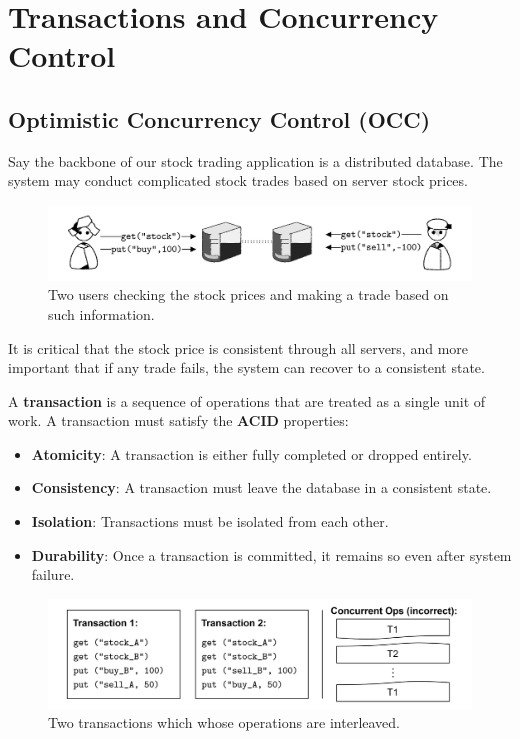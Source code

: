 \newpage 

\section{Transactions and Concurrency Control}
\subsection{Optimistic Concurrency Control (OCC)}

\noindent
Say the backbone of our stock trading application is a 
distributed database. The system may conduct complicated
stock trades based on server stock prices.
\begin{figure}[h]
    \centering
    \includegraphics[width=\textwidth]{Sections/trans/stock.png}
    \caption{Two users checking the stock prices and making a trade based on such information.}
    \label{fig:stock_trading}
\end{figure}

\noindent
It is critical that the stock price is consistent through all servers, and 
more important that if any trade fails, the system can recover to a consistent state.

\begin{Def}[Transaction]

    A \textbf{transaction} is a sequence of operations that are treated as a single unit of work.
    A transaction must satisfy the \textbf{ACID} properties:
    \begin{itemize}
        \item \textbf{Atomicity}: A transaction is either fully completed or dropped entirely.
        \item \textbf{Consistency}: A transaction must leave the database in a consistent state.
        \item \textbf{Isolation}: Transactions must be isolated from each other.
        \item \textbf{Durability}: Once a transaction is committed, it remains so even after system failure.
    \end{itemize}
\end{Def}

\vspace{-0.5em}
\begin{figure}[h]
    \centering 
    \includegraphics[width=\textwidth]{Sections/trans/stock_2.png}
    \caption{Two transactions which whose operations are interleaved.}
    \label{fig:stock_trading}
\end{figure}

